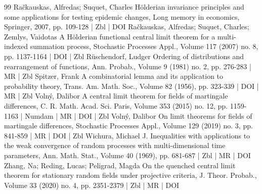 \documentclass[10pt]{amsart}
\theoremstyle{definition}\newtheorem{defi}[theo]{Definition}\newtheorem{rema}[theo]{Remark}\newtheorem{exam}[theo]{Example}\newtheorem{exem}[theo]{Example}\newtheorem{nota}[theo]{Notation}
\begin{document}
\begin{thebibliography}{99}
 Račkauskas, Alfredas; Suquet, Charles Hölderian invariance principles and some applications for testing epidemic changes, Long memory in economics, Springer, 2007, pp. 109-128 | Zbl | DOI
 Račkauskas, Alfredas; Suquet, Charles; Zemlys, Vaidotas A Hölderian functional central limit theorem for a multi-indexed summation process, Stochastic Processes Appl., Volume 117 (2007) no. 8, pp. 1137-1164 | DOI | Zbl
 Rüschendorf, Ludger Ordering of distributions and rearrangement of functions, Ann. Probab., Volume 9 (1981) no. 2, pp. 276-283 | MR | Zbl
 Spitzer, Frank A combinatorial lemma and its application to probability theory, Trans. Am. Math. Soc., Volume 82 (1956), pp. 323-339 | DOI | MR | Zbl
 Volný, Dalibor A central limit theorem for fields of martingale differences, C. R. Math. Acad. Sci. Paris, Volume 353 (2015) no. 12, pp. 1159-1163 | Numdam | MR | DOI | Zbl
 Volný, Dalibor On limit theorems for fields of martingale differences, Stochastic Processes Appl., Volume 129 (2019) no. 3, pp. 841-859 | MR | DOI | Zbl
 Wichura, Michael J. Inequalities with applications to the weak convergence of random processes with multi-dimensional time parameters, Ann. Math. Stat., Volume 40 (1969), pp. 681-687 | Zbl | MR | DOI
 Zhang, Na; Reding, Lucas; Peligrad, Magda On the quenched central limit theorem for stationary random fields under projective criteria, J. Theor. Probab., Volume 33 (2020) no. 4, pp. 2351-2379 | Zbl | MR | DOI
\end{thebibliography}
\end{document}
